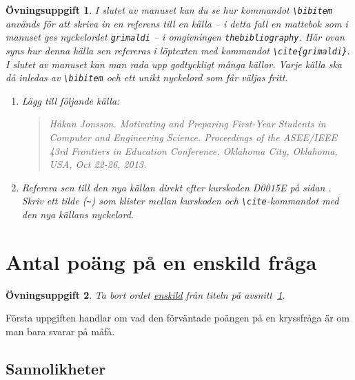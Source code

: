 \documentclass[12pt,a4wide]{article}
\theoremstyle{uppgiftsstil}
\newcommand{\ovningstext}{Övningsuppgift}
\newtheorem{ovning}{\ovningstext}
\newenvironment{uppgift}{\begin{framed}\begin{ovning}}%
                        {\end{ovning}\end{framed}}
\theoremstyle{avklaradstil}
\begin{document}
%
\begin{uppgift}
  I slutet av manuset kan du se hur kommandot \verb|\bibitem| används
  för  att skriva in en referens till en källa -- i detta fall en
  mattebok som i manuset ges nyckelordet \texttt{grimaldi} -- i
  omgivningen \verb|thebibliography|. Här ovan syns hur denna 
  källa sen refereras i löptexten med kommandot
  \verb|\cite{grimaldi}|. I slutet av manuset kan man rada upp
  godtyckligt många källor. Varje källa ska då inledas av
  \verb|\bibitem| och ett unikt nyckelord som får väljas fritt.
%
  \begin{enumerate}
      \item Lägg till följande källa:  
%
        \begin{quote}
          Håkan Jonsson.  \emph{Motivating and Preparing First-Year Students
            in Computer and Engineering Science}.  Proceedings of the
          ASEE/IEEE 43rd Frontiers in Education Conference.  Oklahoma City,
          Oklahoma, USA, Oct 22-26, 2013.
        \end{quote}
%
      \item   Referera sen till den nya källan direkt efter kurskoden
        D0015E på sidan
        \pageref{d0010e}.  %
        Skriv ett tilde (\verb|~|) som klister mellan kurskoden och
        \verb|\cite|-kommandot med den nya källans nyckelord. 
  \end{enumerate}
%
\end{uppgift}

\section{Antal poäng på en enskild fråga}
\label{sec:question}   

\begin{uppgift}
  Ta bort ordet \underline{enskild} från titeln på
  avsnitt~\ref{sec:question}.  
\end{uppgift}
%
Första uppgiften handlar om vad den förväntade poängen på en
kryssfråga är om man bara svarar på måfå. 

\subsection{Sannolikheter}       %
\end{document}
